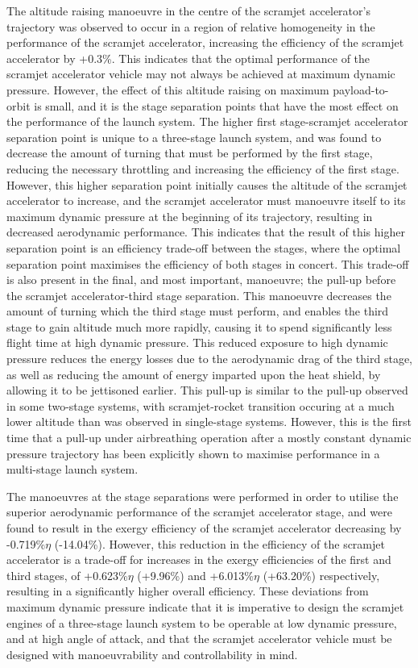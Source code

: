 The altitude raising manoeuvre in the centre of the scramjet accelerator's trajectory was observed to occur in a region of relative homogeneity in the performance of the scramjet accelerator, increasing the efficiency of the scramjet accelerator by +0.3\%. This indicates that the optimal performance of the scramjet accelerator vehicle may not always be achieved at maximum dynamic pressure.  
However, the effect of this altitude raising on maximum payload-to-orbit is small, and it is the stage separation points that have the most effect on the performance of the launch system.
The higher first stage-scramjet accelerator separation point is unique to a three-stage launch system, and was found to decrease the amount of turning that must be performed by the first stage,
reducing the necessary throttling and increasing the efficiency of the first stage. However, this higher separation point initially causes the altitude of the scramjet accelerator to increase, and the scramjet accelerator must manoeuvre itself to its maximum dynamic pressure at the beginning of its trajectory, resulting in decreased aerodynamic performance. This indicates that the result of this higher separation point is an efficiency trade-off between the stages, where the optimal separation point maximises the efficiency of both stages in concert. 
 This trade-off is also present in the final, and most important, manoeuvre; the pull-up before the scramjet accelerator-third stage separation. This manoeuvre decreases the amount of turning which the third stage must perform, and enables the third stage to gain altitude much more rapidly, causing it to spend significantly less flight time at high dynamic pressure. 
This reduced exposure to high dynamic pressure reduces the energy losses due to the aerodynamic drag of the third stage, as well as reducing the amount of energy imparted upon the heat shield, by allowing it to be jettisoned earlier. This pull-up is similar to the pull-up observed in some two-stage systems, with scramjet-rocket transition occuring at a much lower altitude than was observed in single-stage systems. However, this is the first time that a pull-up under airbreathing operation after a mostly constant dynamic pressure trajectory has been explicitly shown to maximise performance in a multi-stage launch system.

The manoeuvres at the stage separations were performed in order to utilise the superior aerodynamic performance of the scramjet accelerator stage, and were found to result in the exergy efficiency of the scramjet accelerator decreasing by -0.719\%$\eta$ (-14.04\%). However, this reduction in the efficiency of the scramjet accelerator is a trade-off for increases in the exergy efficiencies of the first and third stages, of +0.623\%$\eta$ (+9.96\%) and +6.013\%$\eta$ (+63.20\%) respectively, resulting in a significantly higher overall efficiency. These deviations from maximum dynamic pressure indicate that it is imperative to design the scramjet engines of a three-stage launch system to be operable at low dynamic pressure, and at high angle of attack, and that the scramjet accelerator vehicle must be designed with manoeuvrability and controllability in mind.

